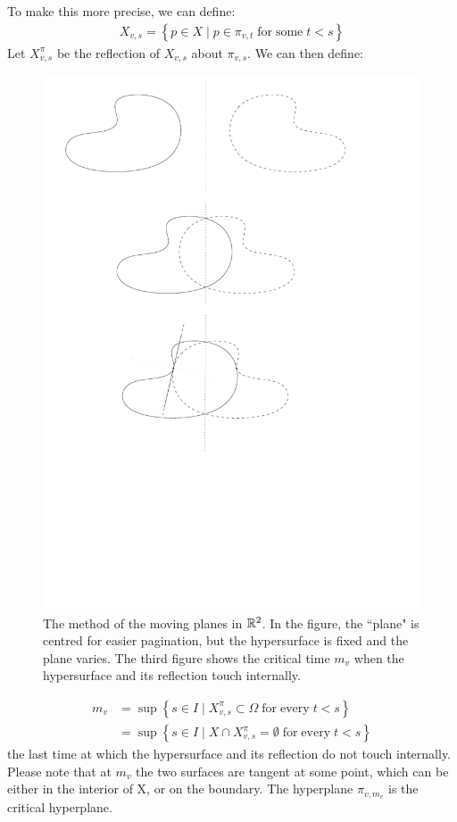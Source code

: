 To make this more precise, we can define: 
\begin{align*}
	X_{v, s} = \left\{p \in X \;|\; p\in \pi_{v, t} \; \mathrm{ for \; some }\; t < s\right\}
\end{align*}
Let $X_{v, s}^\pi$ be the reflection of $X_{v, s}$ about $\pi_{v, s}$. We can then define: 
\begin{figure}
	\centering
	\includegraphics[width=\textwidth]{"figures/6_method moving planes"}
	\caption{The method of the moving planes in $\mathbb{R}^2$. In the figure, the ``plane" is centred for easier pagination, but the hypersurface is fixed and the plane varies. The third figure shows the critical time $m_v$ when the hypersurface and its reflection touch internally.}
\end{figure}

\begin{align*}
m_v &= \sup\left\{s \in I \;|\; X_{v, s}^\pi \subset \Omega \; \mathrm{ for \; every }\; t < s \right\}\\
 &= \sup\left\{s \in I \;|\; X \cap X_{v, s}^\pi =\emptyset \; \mathrm{ for \; every }\; t < s \right\}
\end{align*}
the last time at which the hypersurface and its reflection do not touch internally. Please note that at $m_v$ the two surfaces are tangent at some point, which can be either in the interior of X, or on the boundary. The hyperplane $\pi_{v, m_v}$ is the critical hyperplane. 


